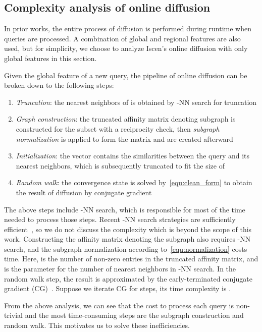 \documentclass[letterpaper]{article} \usepackage{aaai19}  \usepackage{times}  \usepackage{helvet}  \usepackage{courier}  \usepackage{url}  \usepackage{graphicx}  \frenchspacing  \setlength{\pdfpagewidth}{8.5in}  \setlength{\pdfpageheight}{11in}
\begin{document}
\subsection{Complexity analysis of online diffusion}

In prior works, the entire process of diffusion is performed during runtime when queries are processed.
A combination of global and regional features are also used, but for simplicity, we choose to analyze Iscen's online diffusion with only global features in this section.


Given the global feature  of a new query, the pipeline of online diffusion can be broken down to the following steps:
\begin{enumerate}
\item \emph{Truncation}: the nearest neighbors  of  is obtained by -NN search for truncation
\item \emph{Graph construction}: the truncated affinity matrix  denoting subgraph is constructed for the subset  with a reciprocity check,
then \textit{subgraph normalization} is applied to form the matrix  and  are created afterward
\item \emph{Initialization}: the vector  contains the similarities between the query and its nearest neighbors, which is subsequently truncated to fit the size of 
\item \textit{Random walk}: the convergence state is solved by~\cref{equ:clean_form} to obtain the result of diffusion by conjugate gradient
\end{enumerate}
The above steps include -NN search, which is responsible for most of the time needed to process those steps.
Recent -NN search strategies are sufficiently efficient~\cite{jegou2011product,malkov2016efficient,johnson2017billion}, so we do not discuss the complexity which is beyond the scope of this work.
Constructing the affinity matrix denoting the subgraph also requires -NN search,
and the subgraph normalization according to~\cref{equ:normalization} costs  time.
Here,  is the number of non-zero entries in the truncated affinity matrix, and  is the parameter for the number of nearest neighbors in -NN search.
In the random walk step, the result is approximated by the early-terminated conjugate gradient (CG)~\cite{nocedal2006numerical,iscen2017efficient}.
Suppose we iterate CG for  steps, its time complexity is .

From the above analysis, we can see that the cost to process each query is non-trivial and the most time-consuming steps are the subgraph construction and random walk.
This motivates us to solve these inefficiencies.
\end{document}
